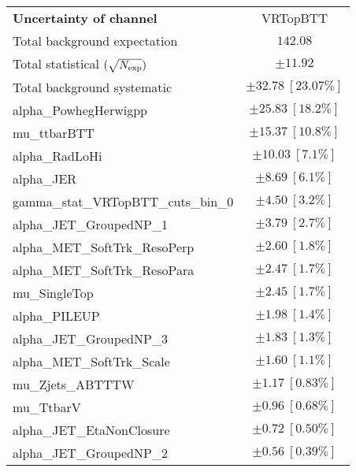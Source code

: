 
\begin{table}
\begin{center}
\setlength{\tabcolsep}{0.0pc}
\begin{tabular*}{\textwidth}{@{\extracolsep{\fill}}lc}
\noalign{\smallskip}\hline\noalign{\smallskip}
{\bf Uncertainty of channel}                                    & VRTopBTT            \\
\noalign{\smallskip}\hline\noalign{\smallskip}
Total background expectation             &  $142.08$       \\
\noalign{\smallskip}\hline\noalign{\smallskip}
Total statistical $(\sqrt{N_{\rm exp}})$              & $\pm 11.92$       \\
Total background systematic               & $\pm 32.78\ [23.07\%] $             \\
\noalign{\smallskip}\hline\noalign{\smallskip}
\noalign{\smallskip}\hline\noalign{\smallskip}
alpha\_PowhegHerwigpp         & $\pm 25.83\ [18.2\%] $       \\
mu\_ttbarBTT         & $\pm 15.37\ [10.8\%] $       \\
alpha\_RadLoHi         & $\pm 10.03\ [7.1\%] $       \\
alpha\_JER         & $\pm 8.69\ [6.1\%] $       \\
gamma\_stat\_VRTopBTT\_cuts\_bin\_0         & $\pm 4.50\ [3.2\%] $       \\
alpha\_JET\_GroupedNP\_1         & $\pm 3.79\ [2.7\%] $       \\
alpha\_MET\_SoftTrk\_ResoPerp         & $\pm 2.60\ [1.8\%] $       \\
alpha\_MET\_SoftTrk\_ResoPara         & $\pm 2.47\ [1.7\%] $       \\
mu\_SingleTop         & $\pm 2.45\ [1.7\%] $       \\
alpha\_PILEUP         & $\pm 1.98\ [1.4\%] $       \\
alpha\_JET\_GroupedNP\_3         & $\pm 1.83\ [1.3\%] $       \\
alpha\_MET\_SoftTrk\_Scale         & $\pm 1.60\ [1.1\%] $       \\
mu\_Zjets\_ABTTTW         & $\pm 1.17\ [0.83\%] $       \\
mu\_TtbarV         & $\pm 0.96\ [0.68\%] $       \\
alpha\_JET\_EtaNonClosure         & $\pm 0.72\ [0.50\%] $       \\
alpha\_JET\_GroupedNP\_2         & $\pm 0.56\ [0.39\%] $       \\

\end{tabular*}
\end{center}
\end{table}
